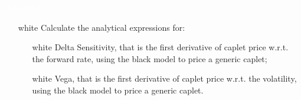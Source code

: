 \documentclass{beamer}
\begin{document}
%

\begin{homework}
\begin{frame}{\textcolor{white}{Homework}}
\begin{itemize}
\item[white] Calculate the analytical expressions for:
\begin{itemize}
	\item[white] Delta Sensitivity, that is the first derivative of caplet price w.r.t. the forward rate, using the black model to price a generic caplet;
	\item[white] Vega, that is the first derivative of caplet price w.r.t. the volatility, using the black model to price a generic caplet.
\end{itemize}
\end{itemize}
\end{frame}
\end{homework}
\end{document}
